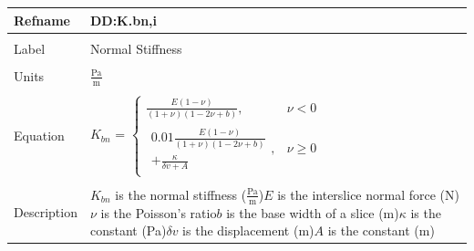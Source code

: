 \documentclass[12pt]{article}
\begin{document}
\noindent \begin{minipage}{\textwidth}
\begin{tabular}{p{} p{}}
\toprule \textbf{Refname} & \textbf{DD:K.bn,i}
\label{DD:K.bn,i}
\\ \midrule \\
Label & Normal Stiffness
\\ \midrule \\
Units & $\frac{\text{Pa}}{\text{m}}$
\\ \midrule \\
Equation & ${K_{bn}}$ = $\begin{cases}
\frac{E \left(1-\nu{}\right)}{\left(1+\nu{}\right) \left(1-2 \nu{}+b\right)}, & \nu{}<0\\
\begin{multlined}
0.01 \frac{E \left(1-\nu{}\right)}{\left(1+\nu{}\right) \left(1-2 \nu{}+b\right)}
\\+
\frac{\kappa{}}{\delta{}v+A}
\end{multlined}
, & \nu{}\geq{}0
\end{cases}$
\\ \midrule \\
Description & ${K_{bn}}$ is the normal stiffness ($\frac{\text{Pa}}{\text{m}}$)\newline$E$ is the interslice normal force (N)\newline$\nu{}$ is the Poisson's ratio\newline$b$ is the base width of a slice (m)\newline$\kappa{}$ is the constant (Pa)\newline$\delta{}v$ is the displacement (m)\newline$A$ is the constant (m)
\\ \bottomrule \end{tabular}
\end{minipage}\\
\end{document}
